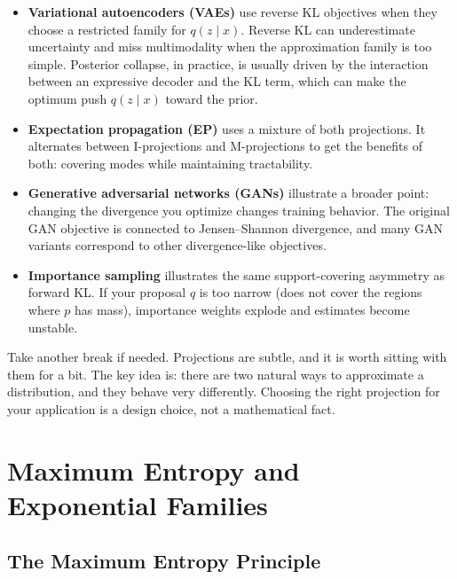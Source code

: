 \begin{itemize}
\item \textbf{Variational autoencoders (VAEs)} use reverse KL objectives when they choose a restricted family for $q(z\mid x)$. Reverse KL can underestimate uncertainty and miss multimodality when the approximation family is too simple. Posterior collapse, in practice, is usually driven by the interaction between an expressive decoder and the KL term, which can make the optimum push $q(z\mid x)$ toward the prior.

\item \textbf{Expectation propagation (EP)} uses a mixture of both projections. It alternates between I-projections and M-projections to get the benefits of both: covering modes while maintaining tractability.

\item \textbf{Generative adversarial networks (GANs)} illustrate a broader point: changing the divergence you optimize changes training behavior. The original GAN objective is connected to Jensen--Shannon divergence, and many GAN variants correspond to other divergence-like objectives.

\item \textbf{Importance sampling} illustrates the same support-covering asymmetry as forward KL. If your proposal $q$ is too narrow (does not cover the regions where $p$ has mass), importance weights explode and estimates become unstable.
\end{itemize}

\vspace{2em}

Take another break if needed. Projections are subtle, and it is worth sitting with them for a bit. The key idea is: there are two natural ways to approximate a distribution, and they behave very differently. Choosing the right projection for your application is a design choice, not a mathematical fact.

\vspace{2em}

\section{Maximum Entropy and Exponential Families}

\subsection{The Maximum Entropy Principle}

